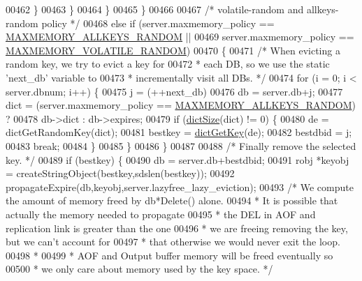 \begin{DoxyCode}
00462                     \}
00463                 \}
00464             \}
00465         \}
00466 
00467         \textcolor{comment}{/* volatile-random and allkeys-random policy */}
00468         \textcolor{keywordflow}{else} \textcolor{keywordflow}{if} (server.maxmemory\_policy == \hyperlink{server_8h_adcde0cca14eeb32039c92a26c4672961}{MAXMEMORY\_ALLKEYS\_RANDOM} ||
00469                  server.maxmemory\_policy == \hyperlink{server_8h_a87a1f8341c97c33069827b359302a1c4}{MAXMEMORY\_VOLATILE\_RANDOM})
00470         \{
00471             \textcolor{comment}{/* When evicting a random key, we try to evict a key for}
00472 \textcolor{comment}{             * each DB, so we use the static 'next\_db' variable to}
00473 \textcolor{comment}{             * incrementally visit all DBs. */}
00474             \textcolor{keywordflow}{for} (i = 0; i < server.dbnum; i++) \{
00475                 j = (++next\_db) %
00476                 db = server.db+j;
00477                 dict = (server.maxmemory\_policy == \hyperlink{server_8h_adcde0cca14eeb32039c92a26c4672961}{MAXMEMORY\_ALLKEYS\_RANDOM}) ?
00478                         db->dict : db->expires;
00479                 \textcolor{keywordflow}{if} (\hyperlink{dict_8h_af193430dd3d5579a52b194512f72c1f0}{dictSize}(dict) != 0) \{
00480                     de = dictGetRandomKey(dict);
00481                     bestkey = \hyperlink{dict_8h_a3271c334309904a3086deca94f96e46e}{dictGetKey}(de);
00482                     bestdbid = j;
00483                     \textcolor{keywordflow}{break};
00484                 \}
00485             \}
00486         \}
00487 
00488         \textcolor{comment}{/* Finally remove the selected key. */}
00489         \textcolor{keywordflow}{if} (bestkey) \{
00490             db = server.db+bestdbid;
00491             robj *keyobj = createStringObject(bestkey,sdslen(bestkey));
00492             propagateExpire(db,keyobj,server.lazyfree\_lazy\_eviction);
00493             \textcolor{comment}{/* We compute the amount of memory freed by db*Delete() alone.}
00494 \textcolor{comment}{             * It is possible that actually the memory needed to propagate}
00495 \textcolor{comment}{             * the DEL in AOF and replication link is greater than the one}
00496 \textcolor{comment}{             * we are freeing removing the key, but we can't account for}
00497 \textcolor{comment}{             * that otherwise we would never exit the loop.}
00498 \textcolor{comment}{             *}
00499 \textcolor{comment}{             * AOF and Output buffer memory will be freed eventually so}
00500 \textcolor{comment}{             * we only care about memory used by the key space. */}

\end{DoxyCode}
